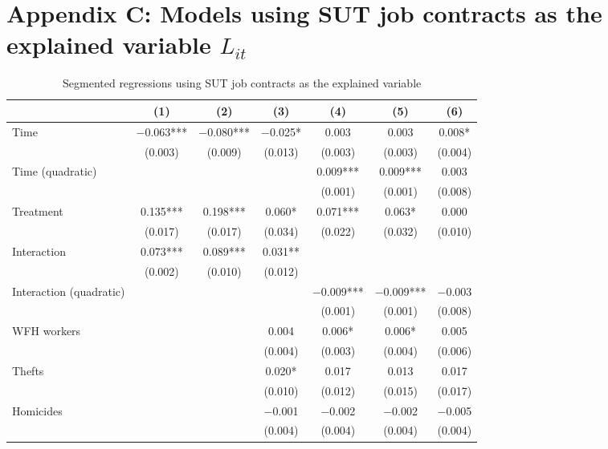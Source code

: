 \documentclass[11pt,a4paper]{article}\usepackage[]{graphicx}\usepackage[]{xcolor}
\begin{document}
\section*{Appendix C: Models using SUT job contracts as the explained variable $L_{it}$}
\label{sec:appc}
\renewcommand{\thetable}{C.\arabic{table}}
\setcounter{table}{0} %

\begin{table}[h]
\caption{Segmented regressions using SUT job contracts as the explained variable}

\begin{tabular}[t]{lcccccc}
\toprule
  & (1) & (2) & (3) & (4) & (5) & (6)\\
\midrule
Time & \num{-0.063}*** & \num{-0.080}*** & \num{-0.025}* & \num{0.003} & \num{0.003} & \num{0.008}*\\
 & (\num{0.003}) & (\num{0.009}) & (\num{0.013}) & (\num{0.003}) & (\num{0.003}) & (\num{0.004})\\
Time (quadratic) &  &  &  & \num{0.009}*** & \num{0.009}*** & \num{0.003}\\
 &  &  &  & (\num{0.001}) & (\num{0.001}) & \vphantom{1} (\num{0.008})\\
Treatment & \num{0.135}*** & \num{0.198}*** & \num{0.060}* & \num{0.071}*** & \num{0.063}* & \num{0.000}\\
 & (\num{0.017}) & (\num{0.017}) & (\num{0.034}) & (\num{0.022}) & (\num{0.032}) & (\num{0.010})\\
Interaction & \num{0.073}*** & \num{0.089}*** & \num{0.031}** &  &  & \\
 & (\num{0.002}) & (\num{0.010}) & (\num{0.012}) &  &  & \\
Interaction (quadratic) &  &  &  & \num{-0.009}*** & \num{-0.009}*** & \num{-0.003}\\
 &  &  &  & (\num{0.001}) & (\num{0.001}) & (\num{0.008})\\
WFH workers &  &  & \num{0.004} & \num{0.006}* & \num{0.006}* & \num{0.005}\\
 &  &  & (\num{0.004}) & (\num{0.003}) & (\num{0.004}) & (\num{0.006})\\
Thefts &  &  & \num{0.020}* & \num{0.017} & \num{0.013} & \num{0.017}\\
 &  &  & (\num{0.010}) & (\num{0.012}) & (\num{0.015}) & (\num{0.017})\\
Homicides &  &  & \num{-0.001} & \num{-0.002} & \num{-0.002} & \num{-0.005}\\
 &  &  & (\num{0.004}) & (\num{0.004}) & (\num{0.004}) & (\num{0.004})\\

\end{tabular}
\end{table}
\end{document}
